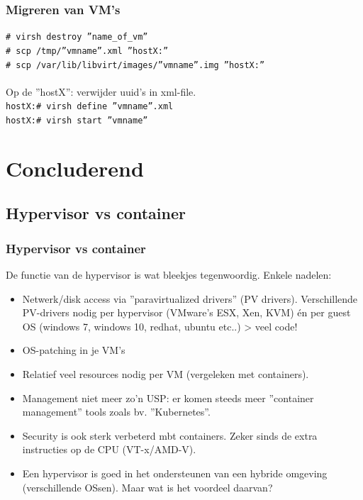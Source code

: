 \begin{styleframefrag}
    \frametitle{Migreren van VM's}
\scriptsize
\pause
{\tt \# virsh destroy ''name\_of\_vm''}\\
\pause
{\tt \# scp /tmp/''vmname''.xml ''hostX:''}\\
\pause
{\tt \# scp /var/lib/libvirt/images/''vmname''.img ''hostX:''}\\
\pause
~\\
Op de ''hostX'': verwijder uuid's in xml-file.\\
\pause
{\tt hostX:\# virsh define ''vmname''.xml}\\
\pause
{\tt hostX:\# virsh start ''vmname''}\\
\end{styleframefrag}

\section{Concluderend}
\subsection {Hypervisor vs container}
\begin{styleframe}
    \frametitle{Hypervisor vs container}
De functie van de hypervisor is wat bleekjes tegenwoordig. Enkele nadelen:
\pause
\begin{itemize}
    \item Netwerk/disk access via ''paravirtualized drivers'' (PV drivers). Verschillende PV-drivers nodig per hypervisor (VMware's ESX, Xen, KVM) \'en per guest OS (windows 7, windows 10, redhat, ubuntu etc..) \-> veel code!
    \pause
    \item OS-patching in je VM's
    \pause
    \item Relatief veel resources nodig per VM (vergeleken met containers).
    \pause
    \item Management niet meer zo'n USP: er komen steeds meer ''container management'' tools zoals bv. ''Kubernetes''.
    \pause
    \item Security is ook sterk verbeterd mbt containers. Zeker sinds de extra instructies op de CPU (VT-x/AMD-V).
    \pause
    \item Een hypervisor is goed in het ondersteunen van een hybride omgeving (verschillende OS\-sen). Maar wat is het voordeel daarvan?
\end{itemize}
\end{styleframe}


